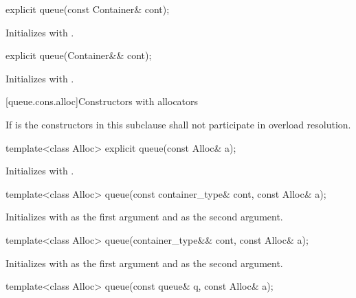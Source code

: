 \begin{itemdecl}
explicit queue(const Container& cont);
\end{itemdecl}

\begin{itemdescr}
\pnum
\effects
Initializes  with .
\end{itemdescr}

\begin{itemdecl}
explicit queue(Container&& cont);
\end{itemdecl}

\begin{itemdescr}
\pnum
\effects
Initializes  with .
\end{itemdescr}

[queue.cons.alloc]{Constructors with allocators}

\pnum
If  is 
the constructors in this subclause shall not participate in overload resolution.

\begin{itemdecl}
template<class Alloc> explicit queue(const Alloc& a);
\end{itemdecl}

\begin{itemdescr}
\pnum
\effects
Initializes  with .
\end{itemdescr}

\begin{itemdecl}
template<class Alloc> queue(const container_type& cont, const Alloc& a);
\end{itemdecl}

\begin{itemdescr}
\pnum
\effects
Initializes  with  as the first argument and 
as the second argument.
\end{itemdescr}

\begin{itemdecl}
template<class Alloc> queue(container_type&& cont, const Alloc& a);
\end{itemdecl}

\begin{itemdescr}
\pnum
\effects
Initializes  with  as the first argument and 
as the second argument.
\end{itemdescr}

\begin{itemdecl}
template<class Alloc> queue(const queue& q, const Alloc& a);
\end{itemdecl}

